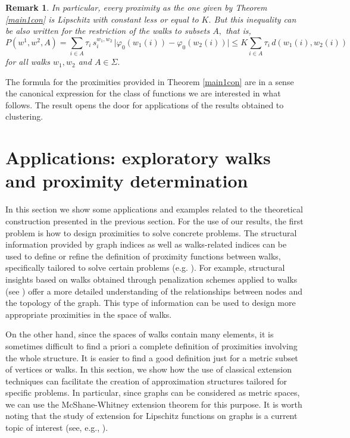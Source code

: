 \documentclass[preprint,12pt]{elsarticle}
\newtheorem{remark}[theorem]{Remark}
\begin{document}
\begin{remark}
In particular, every proximity as the one given by Theorem \ref{main1con} is Lipschitz with constant less or equal to $K.$ But this inequality can be also written for the restriction of the walks to subsets $A,$ that is,
$$
P(w^1,w^2, A) = \sum_{i \in A} \tau_i \, s^{w_1,w_2}_i \, \big| \varphi_0(w_1(i))- \varphi_0(w_2(i)) \big|
\le K
\sum_{i \in A} \tau_i \, d(w_1(i),w_2(i))
$$
for all walks $w_1,w_2$ and $A \in \Sigma.$
\end{remark}

The formula for the proximities provided in Theorem \ref{main1con} are in a sense the canonical expression for the class of functions we are interested in what follows.  The result opens the door for applications of the results obtained to clustering.



\section{Applications: exploratory walks and proximity determination}\label{s5}


In this section we show some applications and examples related to the theoretical construction presented in the previous section. For the use of our results, the first problem is how to design proximities to solve concrete problems. The structural information provided by graph indices as well as walks-related indices can be used to define or refine the definition of proximity functions between walks, specifically tailored to solve certain problems (e.g. \cite{est}). For example, structural insights based on walks obtained through penalization schemes applied to walks (see \cite{del,ests,wei}) offer a more detailed understanding of the relationships between nodes and the topology of the graph. This type of information can be used to design more appropriate proximities in the space of walks.

On the other hand, since the spaces of walks contain many elements, it is sometimes difficult to find a priori a complete definition of proximities involving the whole structure. It is easier to find a good definition just for a metric subset of vertices or walks. In this section, we show how the use of classical extension techniques can facilitate the creation of approximation structures tailored for specific problems. In particular, since graphs can be considered as metric spaces, we can use the McShane-Whitney extension theorem for this purpose. It is worth noting that the study of extension for Lipschitz functions on graphs is a current topic of interest (see, e.g., \cite{Chand}).
\end{document}
